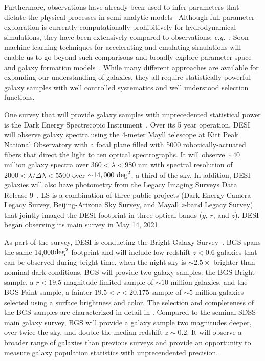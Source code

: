 Furthermore, observations have already been used to infer parameters that
dictate the physical processes in semi-analytic
models~\citep[\emph{e.g.}][]{henriques2009, lu2014, henriques2015} 
Although full parameter exploration is currently computationally prohibitively
for hydrodynamical simulations, they have been extensively compared to
observations: \emph{e.g.}~\cite{genel2014, dave2017a, trayford2017, dickey2021,
donnari2021}.
Soon machine learning techniques for accelerating and emulating simulations
will enable us to go beyond such comparisons and broadly explore parameter
space and galaxy formation
models~\citep[\emph{e.g.}][]{villaescusa-navarro2021}.
While many different approaches are available for expanding our understanding
of galaxies, they all require statistically powerful galaxy samples with
well controlled systematics and well understood selection functions. 

One survey that will provide galaxy samples with unprecedented statistical power
is the Dark Energy Spectrscopic
Instrument~\citep[DESI;][]{desicollaboration2016, desicollaboration2016a,
abareshi2022}. 
Over its 5 year operation, DESI will observe galaxy spectra using the 4-meter
Mayll telescope at Kitt Peak National Observatory with a focal plane filled
with 5000 robotically-actuated fibers that direct the light to ten optical
spectrographs.
It will observe $\sim$40 million galaxy spectra over $360 < \lambda < 980$ nm
with spectral resolution of $2000 < \lambda/\Delta \lambda < 5500$ over 
${\sim}14,000~{\rm deg}^2$, a third of the sky.
In addition, DESI galaxies will also have photometry from the Legacy Imaging
Surveys Data Release 9~\citep[LS;][]{dey2019}. 
LS is a combination of three public projects (Dark Energy Camera Legacy Survey,
Beijing-Arizona Sky Survey, and Mayall $z$-band Legacy Survey) that jointly
imaged the DESI footprint in three optical bands ($g$, $r$, and $z$). 
DESI began observing its main survey in May 14, 2021. 

As part of the survey, DESI is conducting the Bright Galaxy
Survey~\citep[BGS;][]{hahn2022}.
BGS spans the same 14,000${\rm deg}^2$ footprint and will include low redshift
$z< 0.6$ galaxies that can be observed during bright time, when the night sky
is ${\sim}2.5\times$ brighter than nominal dark conditions,
BGS will provide two galaxy samples: the BGS Bright sample, a $r < 19.5$
magnitude-limited sample of ${\sim}10$ million galaxies, and the BGS Faint
sample, a fainter $19.5 < r < 20.175$ sample of ${\sim 5}$ million galaxies
selected using a surface brightness and color. 
The selection and completeness of the BGS samples are characterized in detail
in \cite{hahn2023}. 
Compared to the seminal SDSS main galaxy survey, BGS will provide a galaxy
sample two magnitudes deeper, over twice the sky, and double the median
redshift $z{\sim}0.2$. 
It will observe a broader range of galaxies than previous surveys  and provide
an opportunity to measure galaxy population statistics with unprecendented
precision.

